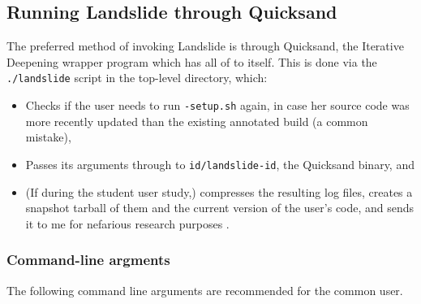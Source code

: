 
\subsection{Running Landslide through Quicksand}
\label{sec:landslide-quicksand-options}

The preferred method of invoking Landslide is through Quicksand, the Iterative Deepening wrapper program which has all of  to itself.
This is done via the {\tt ./landslide} script in the top-level directory, which:
\begin{itemize}
	\item Checks if the user needs to run {\tt *-setup.sh} again, in case her source code was more recently updated than the existing annotated build (a common mistake),
	\item Passes its arguments through to {\tt id/landslide-id}, the Quicksand binary,
		and
	\item (If during the student user study,) compresses the resulting log files,
		creates a snapshot tarball of them and the current version of the user's code,
		and sends it to me for nefarious research purposes
		.
\end{itemize}


\subsubsection{Command-line argments}

The following command line arguments are recommended for the common user.

